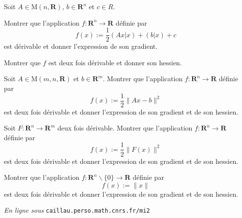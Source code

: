 \documentclass[11pt,a4paper]{article}
\def\R{\mathbf{R}}
\def\M{\mathrm{M}}
\theoremstyle{plain}
\theoremstyle{definition}
\begin{document}
\begin{Exercice} Soit $A \in \M(n,\R)$, $b \in \R^n$ et $c \in R$.
\begin{Question}
Montrer que l'application $f : \R^n \to \R$ d\'efinie par
\[ f(x) := \frac{1}{2}(Ax|x)+(b|x)+c \]
est d\'erivable et donner l'expression de son gradient.
\end{Question}
\begin{Question} Montrer que $f$ est deux fois d\'erivable et donner son hessien.
\end{Question}
\end{Exercice}

\newpage

\begin{Exercice}
\begin{Question}
Soit $A \in \M(m,n,\R)$ et $b \in \R^m$.
Montrer que l'application $f : \R^n \to \R$ d\'efinie par
\[ f(x) := \frac{1}{2} \|Ax-b\|^2 \]
est deux fois d\'erivable et donner l'expression de son gradient et de son hessien.
\end{Question}
\begin{Question}
Soit $F : \R^n \to \R^m$ deux fois d\'erivable.
Montrer que l'application $f : \R^n \to \R$ d\'efinie par
\[ f(x) := \frac{1}{2} \|F(x)\|^2 \]
est deux fois d\'erivable et donner l'expression de son gradient et de son hessien.
\end{Question}
\end{Exercice}

\begin{Exercice}
Montrer que l'application $f : \R^n\backslash \{0\} \to \R$ d\'efinie par
\[ f(x) := \|x\| \]
est deux fois d\'erivable et donner l'expression de son gradient et de son hessien.
\end{Exercice}

\vfill \begin{flushright}{\footnotesize \emph{En ligne sous}
\texttt{caillau.perso.math.cnrs.fr/mi2}} \end{flushright}
\end{document}
